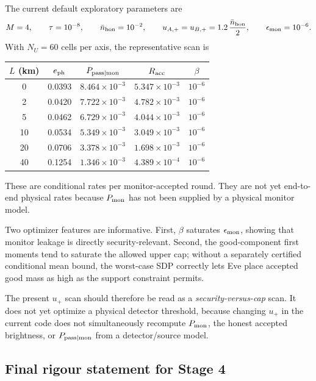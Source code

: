 \documentclass[11pt]{article}
\theoremstyle{remark}
\begin{document}
The current default exploratory parameters are
\[
    M=4,
    \qquad
    \tau=10^{-8},
    \qquad
    \bar n_{\rm hon}=10^{-2},
    \qquad
    u_{A,+}=u_{B,+}=1.2\,\frac{\bar n_{\rm hon}}{2},
    \qquad
    \epsilon_{\rm mon}=10^{-6}.
\]
With \(N_U=60\) cells per axis, the representative scan is
\begin{center}
\begin{tabular}{ccccc}
\toprule
\(L\) (km) & \(e_{\rm ph}\) & \(P_{\rm pass|mon}\) & \(R_{\rm acc}\) & \(\beta\)\\
\midrule
0  & 0.0393 & \(8.464\times10^{-3}\) & \(5.347\times10^{-3}\) & \(10^{-6}\)\\
2  & 0.0420 & \(7.722\times10^{-3}\) & \(4.782\times10^{-3}\) & \(10^{-6}\)\\
5  & 0.0462 & \(6.729\times10^{-3}\) & \(4.044\times10^{-3}\) & \(10^{-6}\)\\
10 & 0.0534 & \(5.349\times10^{-3}\) & \(3.049\times10^{-3}\) & \(10^{-6}\)\\
20 & 0.0706 & \(3.378\times10^{-3}\) & \(1.698\times10^{-3}\) & \(10^{-6}\)\\
40 & 0.1254 & \(1.346\times10^{-3}\) & \(4.389\times10^{-4}\) & \(10^{-6}\)\\
\bottomrule
\end{tabular}
\end{center}
These are conditional rates per monitor-accepted round.  They are not yet
end-to-end physical rates because \(P_{\rm mon}\) has not been supplied by a
physical monitor model.

Two optimizer features are informative.  First, \(\beta\) saturates
\(\epsilon_{\rm mon}\), showing that monitor leakage is directly
security-relevant.  Second, the good-component first moments tend to saturate
the allowed upper cap; without a separately certified conditional mean bound,
the worst-case SDP correctly lets Eve place accepted good mass as high as the
support constraint permits.

The present \(u_+\) scan should therefore be read as a
\emph{security-versus-cap} scan.  It does not yet optimize a physical detector
threshold, because changing \(u_+\) in the current code does not simultaneously
recompute \(P_{\rm mon}\), the honest accepted brightness, or
\(P_{\rm pass|mon}\) from a detector/source model.

\subsection{Final rigour statement for Stage 4}
\end{document}
